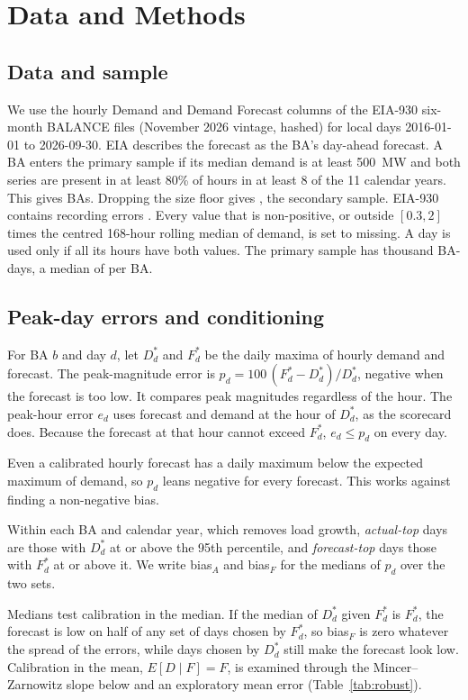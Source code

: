 \documentclass[conference,a4paper]{IEEEtran}
\begin{document}
\section{Data and Methods}

\subsection{Data and sample}
We use the hourly Demand and Demand Forecast columns of the EIA-930 six-month BALANCE files (November 2026 vintage, hashed) for local days 2016-01-01 to 2026-09-30. EIA describes the forecast as the BA's day-ahead forecast. A BA enters the primary sample if its median demand is at least 500~MW and both series are present in at least 80\% of hours in at least 8 of the 11 calendar years. This gives  BAs. Dropping the size floor gives , the secondary sample. EIA-930 contains recording errors \cite{ruggles2020eia}. Every value that is non-positive, or outside $[0.3, 2]$ times the centred 168-hour rolling median of demand, is set to missing. A day is used only if all its hours have both values. The primary sample has  thousand BA-days, a median of  per BA.

\subsection{Peak-day errors and conditioning}
For BA $b$ and day $d$, let $D^*_d$ and $F^*_d$ be the daily maxima of hourly demand and forecast. The peak-magnitude error is $p_d=100\,(F^*_d-D^*_d)/D^*_d$, negative when the forecast is too low. It compares peak magnitudes regardless of the hour. The peak-hour error $e_d$ uses forecast and demand at the hour of $D^*_d$, as the scorecard does. Because the forecast at that hour cannot exceed $F^*_d$, $e_d\le p_d$ on every day.

Even a calibrated hourly forecast has a daily maximum below the expected maximum of demand, so $p_d$ leans negative for every forecast. This works against finding a non-negative bias.

Within each BA and calendar year, which removes load growth, \emph{actual-top} days are those with $D^*_d$ at or above the 95th percentile, and \emph{forecast-top} days those with $F^*_d$ at or above it. We write bias$_A$ and bias$_F$ for the medians of $p_d$ over the two sets.

Medians test calibration in the median. If the median of $D^*_d$ given $F^*_d$ is $F^*_d$, the forecast is low on half of any set of days chosen by $F^*_d$, so bias$_F$ is zero whatever the spread of the errors, while days chosen by $D^*_d$ still make the forecast look low. Calibration in the mean, $E[D\mid F]=F$, is examined through the Mincer--Zarnowitz slope below and an exploratory mean error (Table~\ref{tab:robust}).
\end{document}
